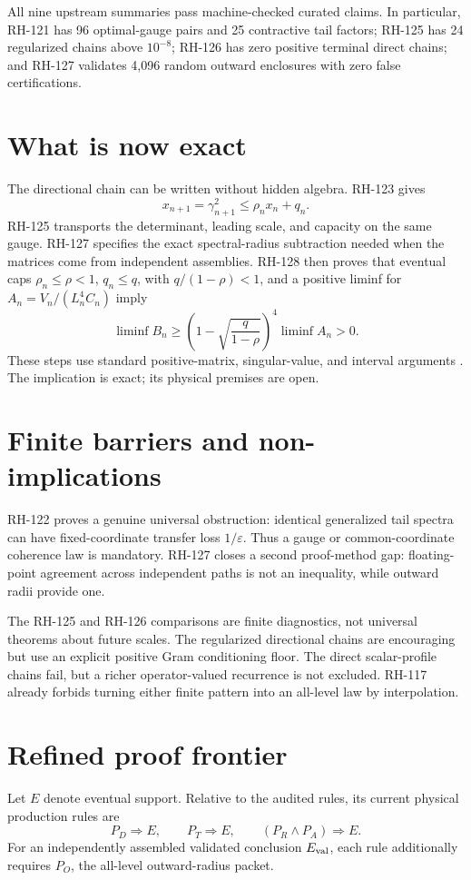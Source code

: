 \documentclass[12pt]{article}\usepackage[margin=1in]{geometry}\usepackage{amsmath,amssymb,amsthm,booktabs,graphicx,natbib,microtype}\newtheorem{theorem}{Theorem}\newtheorem{remark}[theorem]{Remark}
\begin{document}
All nine upstream summaries pass machine-checked curated claims.  In
particular, RH-121 has 96 optimal-gauge pairs and 25 contractive tail
factors; RH-125 has 24 regularized chains above $10^{-8}$; RH-126 has zero
positive terminal direct chains; and RH-127 validates 4,096 random outward
enclosures with zero false certifications.

\section{What is now exact}
The directional chain can be written without hidden algebra.  RH-123 gives
\[
x_{n+1}=\gamma_{n+1}^2\leq\rho_nx_n+q_n.
\]
RH-125 transports the determinant, leading scale, and capacity on the same
gauge.  RH-127 specifies the exact spectral-radius subtraction needed when
the matrices come from independent assemblies.  RH-128 then proves that
eventual caps $\rho_n\leq\rho<1$, $q_n\leq q$, with
$q/(1-\rho)<1$, and a positive liminf for
$A_n=V_n/(L_n^4C_n)$ imply
\[
\liminf B_n\geq
\left(1-\sqrt{\frac{q}{1-\rho}}\right)^4\liminf A_n>0.
\]
These steps use standard positive-matrix, singular-value, and interval
arguments \citep{HornJohnson1991,Moore1966}.  The implication is exact; its
physical premises are open.

\section{Finite barriers and non-implications}
RH-122 proves a genuine universal obstruction: identical generalized tail
spectra can have fixed-coordinate transfer loss $1/\varepsilon$.  Thus a
gauge or common-coordinate coherence law is mandatory.  RH-127 closes a
second proof-method gap: floating-point agreement across independent paths
is not an inequality, while outward radii provide one.

The RH-125 and RH-126 comparisons are finite diagnostics, not universal
theorems about future scales.  The regularized directional chains are
encouraging but use an explicit positive Gram conditioning floor.  The
direct scalar-profile chains fail, but a richer operator-valued recurrence
is not excluded.  RH-117 already forbids turning either finite pattern into
an all-level law by interpolation.

\section{Refined proof frontier}
Let $E$ denote eventual support.  Relative to the audited rules, its current
physical production rules are
\[
P_D\Rightarrow E,\qquad P_T\Rightarrow E,\qquad
(P_R\wedge P_A)\Rightarrow E.
\]
For an independently assembled validated conclusion $E_{\rm val}$, each
rule additionally requires $P_O$, the all-level outward-radius packet.
\end{document}
